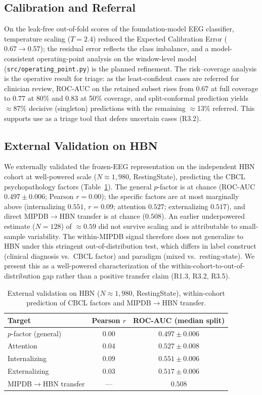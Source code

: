 \subsection{Calibration and Referral}
On the leak-free out-of-fold scores of the foundation-model EEG classifier,
temperature scaling ($T = 2.4$) reduced the Expected Calibration Error
($0.67 \rightarrow 0.57$); the residual error reflects the class imbalance, and a
model-consistent operating-point analysis on the window-level model
(\texttt{src/operating\_point.py}) is the planned refinement. The risk--coverage
analysis is the operative result for triage: as the least-confident cases are
referred for clinician review, ROC-AUC on the retained subset rises from $0.67$ at
full coverage to $0.77$ at 80\% and $0.83$ at 50\% coverage, and split-conformal
prediction yields $\approx$87\% decisive (singleton) predictions with the
remaining $\approx$13\% referred. This supports use as a triage tool that defers
uncertain cases (R3.2).

\subsection{External Validation on HBN}
We externally validated the frozen-EEG representation on the independent HBN cohort
at well-powered scale ($N \approx 1{,}980$, RestingState), predicting the CBCL
psychopathology factors (Table~\ref{tab:hbn}). The general $p$-factor is at chance
(ROC-AUC $0.497 \pm 0.006$; Pearson $r = 0.00$); the specific factors are at most
marginally above (internalizing $0.551$, $r = 0.09$; attention $0.527$;
externalizing $0.517$), and direct MIPDB$\rightarrow$HBN transfer is at chance
($0.508$). An earlier underpowered estimate ($N=128$) of $\approx 0.59$ did not
survive scaling and is attributable to small-sample variability. The within-MIPDB
signal therefore does not generalize to HBN under this stringent out-of-distribution
test, which differs in label construct (clinical diagnosis vs.\ CBCL factor) and
paradigm (mixed vs.\ resting-state). We present this as a well-powered
characterization of the within-cohort-to-out-of-distribution gap rather than a
positive transfer claim (R1.3, R3.2, R3.5).

\begin{table}[t]
\centering\footnotesize
\caption{External validation on HBN ($N\approx1{,}980$, RestingState), within-cohort
prediction of CBCL factors and MIPDB$\rightarrow$HBN transfer.}
\label{tab:hbn}
\begin{tabular}{lcc}
\toprule
\textbf{Target} & \textbf{Pearson $r$} & \textbf{ROC-AUC (median split)} \\
\midrule
$p$-factor (general) & $0.00$ & $0.497 \pm 0.006$ \\
Attention & $0.04$ & $0.527 \pm 0.008$ \\
Internalizing & $0.09$ & $0.551 \pm 0.006$ \\
Externalizing & $0.03$ & $0.517 \pm 0.006$ \\
MIPDB$\rightarrow$HBN transfer & --- & $0.508$ \\
\bottomrule
\end{tabular}
\end{table}

